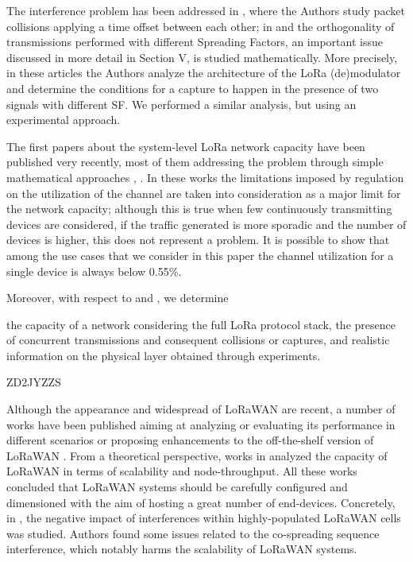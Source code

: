 The interference problem has been addressed in \cite{bor_lora_nodate},
	where the Authors study packet collisions applying a time offset between each other;
	in \cite{georgiou_low_2017} and \cite{goursaud_dedicated_2015} the orthogonality of transmissions performed with different Spreading Factors,
	an important issue discussed in more detail in Section V,
	is studied mathematically.
More precisely,
	in these articles the Authors analyze the architecture of the LoRa (de)modulator and determine the conditions for a capture to happen in the presence of two signals with different SF.
We performed a similar analysis,
	but using an experimental approach.

The first papers about the system-level LoRa network capacity have been published very recently,
	most of them addressing the problem through simple mathematical approaches \cite{mikhaylov_analysis_2016},
	\cite{adelantado_understanding_2017}.
In these works the limitations imposed by regulation on the utilization of the channel are taken into consideration as a major limit for the network capacity;
	although this is true when few continuously transmitting devices are considered,
	if the traffic generated is more sporadic and the number of devices is higher,
	this does not represent a problem.
It is possible to show that among the use cases that we consider in this paper the channel utilization for a single device is always below 0.55\%.

Moreover,
	with respect to \cite{mikhaylov_analysis_2016} and \cite{adelantado_understanding_2017},
	we determine

the capacity of a network considering the full LoRa protocol stack,
	the presence of concurrent transmissions and consequent collisions or captures,
	and realistic information on the physical layer obtained through experiments.



\cite{sanchez-iborra_performance_2018} ZD2JYZZS


Although the appearance and widespread of LoRaWAN are recent,
	a number of works have been published aiming at analyzing or evaluating its performance in different scenarios or proposing enhancements to the off-the-shelf version of LoRaWAN \cite{herrera-tapia_evaluating_2017}.
From a theoretical perspective,
	works in \cite{georgiou_low_2017}\cite{mikhaylov_analysis_2016}\cite{bankov_limits_2016} analyzed the capacity of LoRaWAN in terms of scalability and node-throughput.
All these works concluded that LoRaWAN systems should be carefully configured and dimensioned with the aim of hosting a great number of end-devices.
Concretely,
	in \cite{georgiou_low_2017},
	the negative impact of interferences within highly-populated LoRaWAN cells was studied.
Authors found some issues related to the co-spreading sequence interference,
	which notably harms the scalability of LoRaWAN systems.

